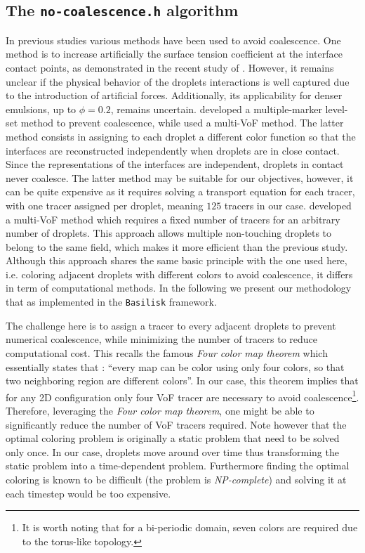 \subsection{The \texttt{no-coalescence.h} algorithm}

In previous studies various methods have been used to avoid coalescence. 
One method is to increase artificially the surface tension coefficient at the interface contact points, as demonstrated in the recent study of \citet{hidman2023assessing}.
However, it remains unclear if the physical behavior of the droplets interactions is well captured due to the introduction of artificial forces. 
Additionally, its applicability for denser emulsions, up to $\phi = 0.2$, remains uncertain. 
\citet{balcazar2015multiple} developed a multiple-marker level-set method to prevent coalescence, while \citet{zhang2021direct} used a multi-VoF method. 
The latter method consists in assigning to each droplet a different color function so  that the interfaces are reconstructed independently when droplets are in close contact.
Since the representations of the interfaces are independent, droplets in contact never coalesce.  
The latter method may be suitable for our objectives, however, it can be quite expensive as it requires solving a transport equation for each tracer, with one tracer assigned per droplet, meaning $125$ tracers in our case. 
\citet{karnakov2022computing} developed a multi-VoF method which requires a fixed number of tracers for an arbitrary number of droplets.
This approach allows multiple non-touching droplets to belong to the same field, which makes it more efficient than the previous study.
Although this approach shares the same basic principle with the one used here, i.e. coloring adjacent droplets with different colors to avoid coalescence, it differs in term of computational methods. 
In the following we present our methodology that as implemented in the \texttt{Basilisk} framework. 

The challenge here is to assign a tracer to every adjacent droplets to prevent numerical coalescence, while minimizing the number of tracers to reduce computational cost. 
This recalls the famous \textit{Four color map theorem} \citep{appel1977solution} which essentially states that : 
\enquote{every map can be color using only four colors, so that two neighboring region are different colors}. 
In our case, this theorem implies that for any 2D configuration only four VoF tracer are necessary to avoid coalescence\footnote{It is worth noting that for a bi-periodic domain, seven colors are required due to the torus-like topology.  }. 
Therefore, leveraging the \textit{Four color map theorem}, one might be able to significantly reduce the number of VoF tracers required.
Note however that the optimal coloring problem is originally a static problem that need to be solved only once. 
In our case, droplets move around over time thus transforming the static problem into a time-dependent problem. 
Furthermore finding the optimal coloring is known to be difficult (the problem is {\em NP-complete}) and solving it at each timestep would be too expensive.

